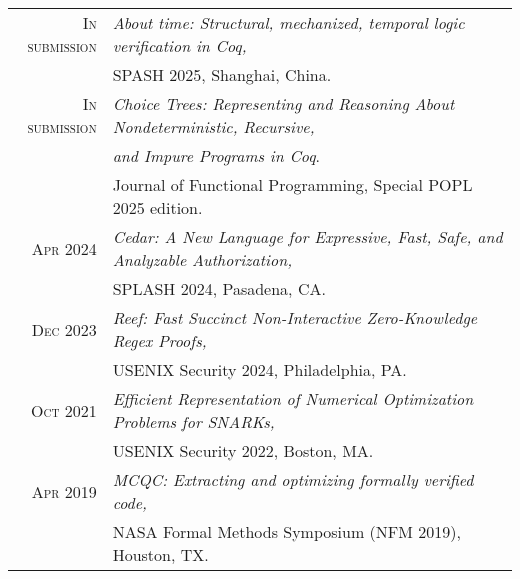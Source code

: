 \begin{tabular}{rl}
\textsc{In submission}& \emph{About time: Structural, mechanized, temporal logic verification in Coq,}\\
                      & SPASH 2025, Shanghai, China.  \\[0.5em]
\textsc{In submission}& \emph{Choice Trees: Representing and Reasoning About Nondeterministic, Recursive,} \\
                      & \emph{and Impure Programs in Coq}. \\
                      & Journal of Functional Programming, Special POPL 2025 edition.  \\[0.5em]
\textsc{Apr} 2024 & \emph{Cedar: A New Language for Expressive, Fast, Safe, and Analyzable Authorization,} \\
                  & SPLASH 2024, Pasadena, CA.  \\[0.5em]
\textsc{Dec} 2023 & \emph{Reef: Fast Succinct Non-Interactive Zero-Knowledge Regex Proofs,} \\
                  & USENIX Security 2024, Philadelphia, PA.  \\[0.5em]
\textsc{Oct} 2021 & \emph{Efficient Representation of Numerical Optimization Problems for SNARKs,} \\
                  & USENIX Security 2022, Boston, MA.  \\[0.5em]
\textsc{Apr} 2019 & \emph{MCQC: Extracting and optimizing formally verified code,} \\
                  & NASA Formal Methods Symposium (NFM 2019), Houston, TX. \\
\end{tabular}
